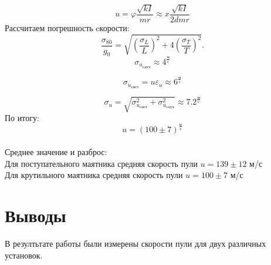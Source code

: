 \documentclass[a4paper]{article}
\begin{document}
\[u = \varphi \frac{\sqrt{kI}}{mr} \approx x \frac{\sqrt{kI}}{2dmr}\]
Рассчитаем погрешность cкорости:
\[
\frac{\sigma_{80}}{g_0} = \sqrt{ \left( \frac{\sigma_L}{L} \right)^2 + 4 \left( \frac{\sigma_T}{T} \right)^2 }.
\]
\[\sigma_{u_{\text{случ}}} \approx 4^{\frac{\text{м}}{\text{с}}}\]

\[\sigma_{u_{\text{сист}}} = u \varepsilon_u \approx 6^{\frac{\text{м}}{\text{с}}}\]

\[\sigma_u = \sqrt{\sigma_{u_{\text{сист}}}^2 + \sigma_{u_{\text{случ}}}^2} \approx 7.2^{\frac{\text{м}}{\text{с}}}\]
По итогу:
\[u = (100 \pm 7)^{\frac{\text{м}}{\text{с}}}\] \\
Среднее значение и разброс: \\
Для поступательного маятника средняя скорость пули $u=139\pm 12$ м/с \\
Для крутильного маятника средняя скорость пули $u=100\pm 7$ м/с

\section{Выводы}
В резултьтате работы были измерены скорости пули для двух различных установок.
\end{document}
